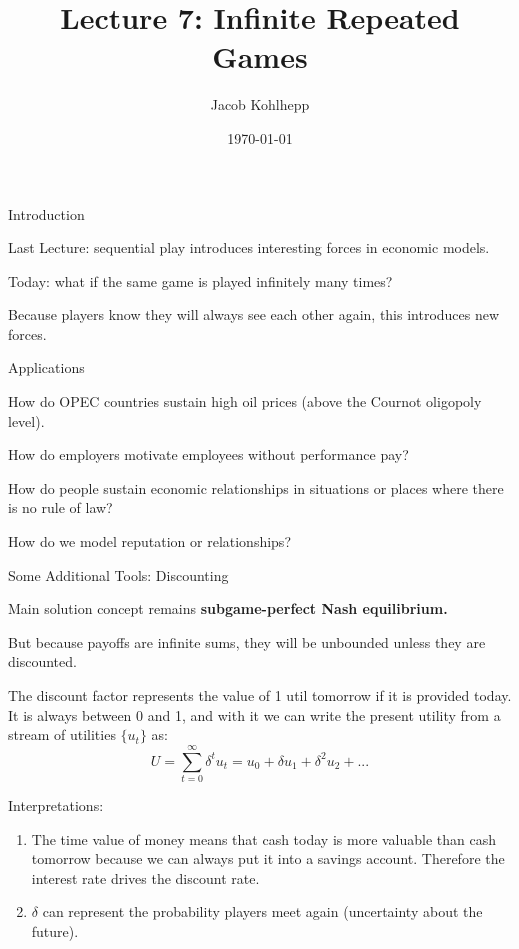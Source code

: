\documentclass[aspectratio=169]{beamer}
\title[Infinite]{Lecture 7: Infinite Repeated Games} %
\author{Jacob Kohlhepp} %
\institute[UCLA] %
{
Econ 101 \\ %
\medskip
}
\date{\today} %
\newenvironment{wideitemize}{\itemize\addtolength{\itemsep}{10pt}}{\enditemize}
\begin{document}
\begin{frame}
\titlepage %
\end{frame}

\begin{frame}{Introduction}
\begin{wideitemize}
    \item Last Lecture: sequential play introduces interesting forces in economic models.
    \item Today: what if the same game is played infinitely many times?
    \item Because players know they will always see each other again, this introduces new forces.

\end{wideitemize}
\end{frame}

\begin{frame}{Applications}
\begin{wideitemize}
    \item How do OPEC countries sustain high oil prices (above the Cournot oligopoly level).
    \item How do employers motivate employees without performance pay?
    \item How do people sustain economic relationships in situations or places where there is no rule of law?
    \item How do we model reputation or relationships?
\end{wideitemize}
    
\end{frame}

\begin{frame}{Some Additional Tools: Discounting}

\begin{wideitemize}
    \item Main solution concept remains \textbf{subgame-perfect Nash equilibrium.}
    \item But because payoffs are infinite sums, they will be unbounded unless they are discounted.
    \begin{definition}
    The discount factor represents the value of 1 util tomorrow if it is provided today. It is always between 0 and 1, and with it we can write the present utility from a stream of utilities $\{u_t\}$ as:
    \[U = \sum^\infty_{t=0} \delta^t u_t = u_0 + \delta u_1+\delta^2 u_2+...\]
    \end{definition}
    \item Interpretations:
    \begin{enumerate}
        \item The time value of money means that cash today is more valuable than cash tomorrow because we can always put it into a savings account. Therefore the interest rate drives the discount rate.
        \item $\delta$ can represent the probability players meet again (uncertainty about the future).
    \end{enumerate}
\end{wideitemize}
    
\end{frame}
\end{document}

